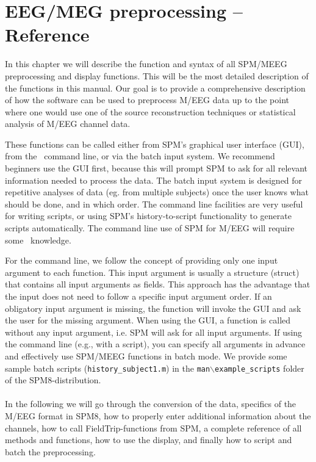 \chapter{EEG/MEG preprocessing -- Reference \label{Chap:eeg:preprocessing}}

In this chapter we will describe the function and syntax of all SPM/MEEG preprocessing and display functions. This will be the most detailed description of the functions in this manual. Our goal is to provide a comprehensive description of how the software can be used to preprocess M/EEG data up to the point where one would use one of the source reconstruction techniques or statistical analysis of M/EEG channel data.

These functions can be called either from SPM's graphical user interface (GUI), from the \matlab\ command line, or via the batch input system. We recommend beginners use the GUI first, because this will prompt SPM to ask for all relevant information needed to process the data. The batch input system is designed for repetitive analyses of data (eg. from multiple subjects) once the user knows what should be done, and in which order. The command line facilities are very useful for writing scripts, or using SPM's history-to-script functionality to generate scripts automatically. The command line use of SPM for M/EEG will require some \matlab\ knowledge.

For the command line, we follow the concept of providing only one input argument to each function. This input argument is usually a structure (struct) that contains all input arguments as fields. This approach has the advantage that the input does not need to follow a specific input argument order. If an obligatory input argument is missing, the function will invoke the GUI and ask the user for the missing argument. When using the GUI, a function is called without any input argument, i.e. SPM will ask for all input arguments. If using the command line (e.g., with a script), you can specify all arguments in advance and effectively use SPM/MEEG functions in batch mode. We provide some sample batch scripts (\texttt{history\_subject1.m}) in the \texttt{man$\backslash$example\_scripts} folder of the SPM8-distribution.
\\
\\
In the following we will go through the conversion of the data, specifics of the M/EEG format in SPM8, how to properly enter additional information about the channels, how to call FieldTrip-functions from SPM, a complete reference of all methods and functions, how to use the display, and finally how to script and batch the preprocessing.

